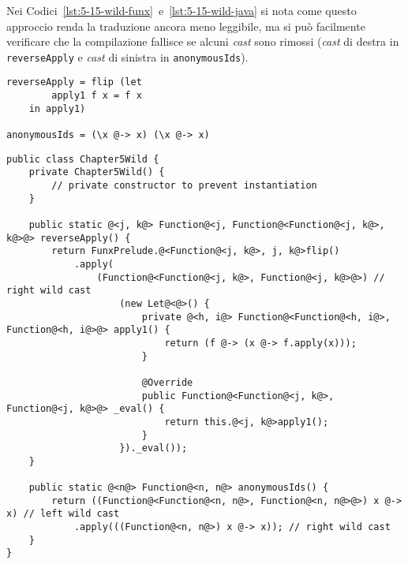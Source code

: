 \newpage

Nei Codici~\ref{lst:5-15-wild-funx}~e~\ref{lst:5-15-wild-java} si nota come questo approccio renda la traduzione ancora meno
leggibile, ma si può facilmente verificare che la compilazione fallisce se alcuni \textit{cast} sono rimossi
(\textit{cast} di destra in \texttt{reverseApply} e \textit{cast} di sinistra in \texttt{anonymousIds}).

\vspace{4mm}
\begin{lstlisting}[caption={Applicazione tra funzioni, espressioni \texttt{let} e \texttt{lambda}}, style=funxCode, label={lst:5-15-wild-funx}]
reverseApply = flip (let
        apply1 f x = f x
    in apply1)

anonymousIds = (\x @-> x) (\x @-> x)
\end{lstlisting}
\vspace{4mm}
\begin{lstlisting}[caption={Traduzione in \texttt{Java} con \textit{cast} "selvaggi"}, style=javaCode, label={lst:5-15-wild-java}]
public class Chapter5Wild {
    private Chapter5Wild() {
        // private constructor to prevent instantiation
    }
    
    public static @<j, k@> Function@<j, Function@<Function@<j, k@>, k@>@> reverseApply() {
        return FunxPrelude.@<Function@<j, k@>, j, k@>flip()
            .apply(
                (Function@<Function@<j, k@>, Function@<j, k@>@>) // right wild cast
                    (new Let@<@>() {
                        private @<h, i@> Function@<Function@<h, i@>, Function@<h, i@>@> apply1() {
                            return (f @-> (x @-> f.apply(x)));
                        }
    
                        @Override
                        public Function@<Function@<j, k@>, Function@<j, k@>@> _eval() {
                            return this.@<j, k@>apply1();
                        }
                    })._eval());
    }
    
    public static @<n@> Function@<n, n@> anonymousIds() {
        return ((Function@<Function@<n, n@>, Function@<n, n@>@>) x @-> x) // left wild cast
            .apply(((Function@<n, n@>) x @-> x)); // right wild cast
    }
}
\end{lstlisting}